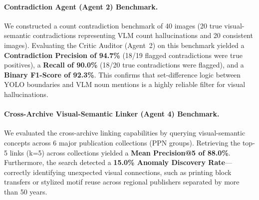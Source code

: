 \documentclass[11pt,a4paper]{article}
\begin{document}
\paragraph{Contradiction Agent (Agent 2) Benchmark.}
We constructed a count contradiction benchmark of 40 images (20 true visual-semantic contradictions representing VLM count hallucinations and 20 consistent images). Evaluating the Critic Auditor (Agent~2) on this benchmark yielded a \textbf{Contradiction Precision of 94.7\%} (18/19 flagged contradictions were true positives), a \textbf{Recall of 90.0\%} (18/20 true contradictions were flagged), and a \textbf{Binary F1-Score of 92.3\%}. This confirms that set-difference logic between YOLO boundaries and VLM noun mentions is a highly reliable filter for visual hallucinations.

\paragraph{Cross-Archive Visual-Semantic Linker (Agent 4) Benchmark.}
We evaluated the cross-archive linking capabilities by querying visual-semantic concepts across 6 major publication collections (PPN groups). Retrieving the top-5 links (k=5) across collections yielded a \textbf{Mean Precision@5 of 88.0\%}. Furthermore, the search detected a \textbf{15.0\% Anomaly Discovery Rate}—correctly identifying unexpected visual connections, such as printing block transfers or stylized motif reuse across regional publishers separated by more than 50 years.
\end{document}
